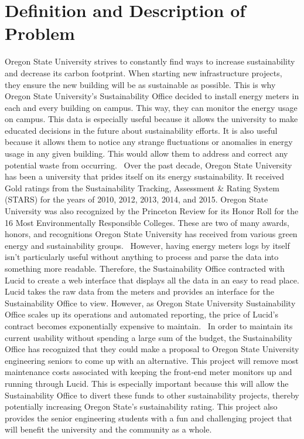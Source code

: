 \documentclass[draftclsnofoot,onecolumn,10pt]{IEEEtran}
\begin{document}
\section{Definition and Description of Problem}
Oregon State University strives to constantly find ways to increase sustainability and decrease its carbon footprint. When starting new infrastructure projects, they ensure the new building will be as sustainable as possible. This is why Oregon State University's Sustainability Office decided to install energy meters in each and every building on campus. This way, they can monitor the energy usage on campus. This data is especially useful because it allows the university to make educated decisions in the future about sustainability efforts. It is also useful because it allows them to notice any strange fluctuations or anomalies in energy usage in any given building. This would allow them to address and correct any potential waste from occurring.\ \smallbreak
Over the past decade, Oregon State University has been a university that prides itself on its energy sustainability. It received Gold ratings from the Sustainability Tracking, Assessment \& Rating System (STARS) for the years of 2010, 2012, 2013, 2014, and 2015. Oregon State University was also recognized by the Princeton Review for its Honor Roll for the 16 Most Environmentally Responsible Colleges. These are two of many awards, honors, and recognitions Oregon State University has received from various green energy and sustainability groups.\ \smallbreak
However, having energy meters logs by itself isn't particularly useful without anything to process and parse the data into something more readable. Therefore, the Sustainability Office contracted with Lucid to create a web interface that displays all the data in an easy to read place. Lucid takes the raw data from the meters and provides an interface for the Sustainability Office to view. However, as Oregon State University Sustainability Office scales up its operations and automated reporting, the price of Lucid's contract becomes exponentially expensive to maintain.\ \smallbreak
In order to maintain its current usability without spending a large sum of the budget, the Sustainability Office has recognized that they could make a proposal to Oregon State University engineering seniors to come up with an alternative. This project will remove most maintenance costs associated with keeping the front-end meter monitors up and running through Lucid. This is especially important because this will allow the Sustainability Office to divert these funds to other sustainability projects, thereby potentially increasing Oregon State's sustainability rating. This project also provides the senior engineering students with a fun and challenging project that will benefit the university and the community as a whole.\
\end{document}
